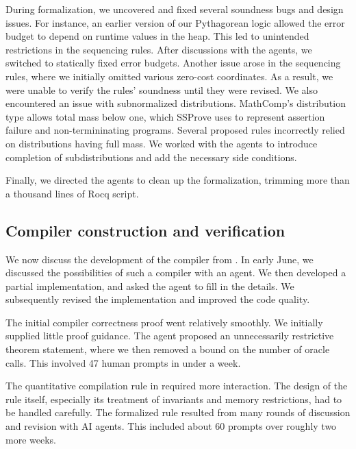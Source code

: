 During formalization, we uncovered and fixed several soundness bugs and design issues.
For instance, an earlier version of our Pythagorean logic allowed the error budget to depend on runtime values in the heap.
This led to unintended restrictions in the sequencing rules.
After discussions with the agents, we switched to statically fixed error budgets.
Another issue arose in the sequencing rules, where we initially omitted various zero-cost coordinates.
As a result, we were unable to verify the rules' soundness until they were revised.
We also encountered an issue with subnormalized distributions.
MathComp's distribution type allows total mass below one, which SSProve uses to represent assertion failure and non-termininating programs.
Several proposed rules incorrectly relied on distributions having full mass.
We worked with the agents to introduce completion of subdistributions and add the necessary side conditions.

Finally, we directed the agents to clean up the formalization,
trimming more than a thousand lines of Rocq script.

\subsection{Compiler construction and verification}

We now discuss the development of the compiler from .
In early June, we discussed the possibilities of such a compiler with an agent.
We then developed a partial implementation, and asked the agent to fill in the details.
We subsequently revised the implementation and improved the code quality.

The initial compiler correctness proof went relatively smoothly.
We initially supplied little proof guidance.
The agent proposed an unnecessarily restrictive theorem statement,
where we then removed a bound on the number of oracle calls.
This involved 47 human prompts in under a week.

The quantitative compilation rule in  required more interaction.
The design of the rule itself, especially its treatment of invariants and memory restrictions, had to be handled carefully.
The formalized rule resulted from many rounds of discussion and revision with AI agents.
This included about 60 prompts over roughly two more weeks.

